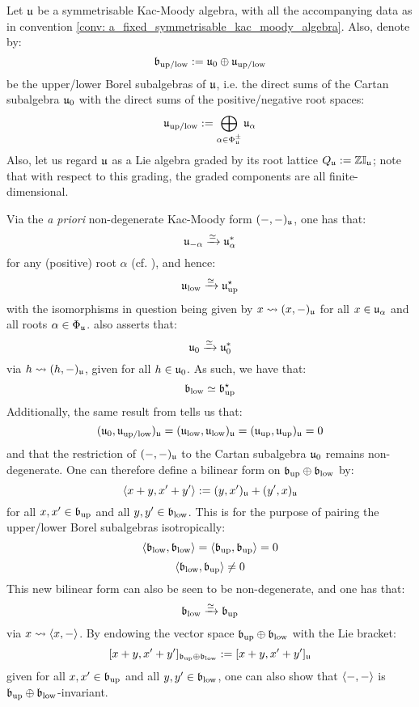         \begin{example} \label{example: kac_moody_manin_triple}
            Let $\mathfrak{u}$ be a symmetrisable Kac-Moody algebra, with all the accompanying data as in convention \ref{conv: a_fixed_symmetrisable_kac_moody_algebra}. Also, denote by:
                $$\mathfrak{b}_{\mathrm{up}/\mathrm{low}} := \mathfrak{u}_0 \oplus \mathfrak{u}_{\mathrm{up}/\mathrm{low}}$$
            be the upper/lower Borel subalgebras of $\mathfrak{u}$, i.e. the direct sums of the Cartan subalgebra $\mathfrak{u}_0$ with the direct sums of the positive/negative root spaces:
                $$\mathfrak{u}_{\mathrm{up}/\mathrm{low}} := \bigoplus_{\alpha \in \Phi_{\mathfrak{u}}^{\pm}} \mathfrak{u}_{\alpha}$$
            Also, let us regard $\mathfrak{u}$ as a Lie algebra graded by its root lattice $Q_{\mathfrak{u}} := \mathbb{Z}\mathbb{I}_{\mathfrak{u}}$; note that with respect to this grading, the graded components are all finite-dimensional.

            Via the \textit{a priori} non-degenerate Kac-Moody form $(-, -)_{\mathfrak{u}}$, one has that:
                $$\mathfrak{u}_{-\alpha} \xrightarrow[]{\simeq} \mathfrak{u}_{\alpha}^*$$
            for any (positive) root $\alpha$ (cf. \cite[Theorem 2.2]{kac_infinite_dimensional_lie_algebras}), and hence:
                $$\mathfrak{u}_{\mathrm{low}} \xrightarrow[]{\simeq} \mathfrak{u}_{\mathrm{up}}^{\star}$$
            with the isomorphisms in question being given by $x \leadsto (x, -)_{\mathfrak{u}}$ for all $x \in \mathfrak{u}_{\alpha}$ and all roots $\alpha \in \Phi_{\mathfrak{u}}$. \cite[Theorem 2.2]{kac_infinite_dimensional_lie_algebras} also asserts that:
                $$\mathfrak{u}_0 \xrightarrow[]{\simeq} \mathfrak{u}_0^*$$
            via $h \leadsto (h, -)_{\mathfrak{u}}$, given for all $h \in \mathfrak{u}_0$. As such, we have that:
                $$\mathfrak{b}_{\mathrm{low}} \simeq \mathfrak{b}_{\mathrm{up}}^{\star}$$
            Additionally, the same result from \cite{kac_infinite_dimensional_lie_algebras} tells us that:
                $$(\mathfrak{u}_0, \mathfrak{u}_{\mathrm{up}/\mathrm{low}})_{\mathfrak{u}} = (\mathfrak{u}_{\mathrm{low}}, \mathfrak{u}_{\mathrm{low}})_{\mathfrak{u}} = (\mathfrak{u}_{\mathrm{up}}, \mathfrak{u}_{\mathrm{up}})_{\mathfrak{u}} = 0$$
            and that the restriction of $(-, -)_{\mathfrak{u}}$ to the Cartan subalgebra $\mathfrak{u}_0$ remains non-degenerate. One can therefore define a bilinear form on $\mathfrak{b}_{\mathrm{up}} \oplus \mathfrak{b}_{\mathrm{low}}$ by:
                $$\langle x + y, x' + y'\rangle := (y, x')_{\mathfrak{u}} + (y', x)_{\mathfrak{u}}$$
            for all $x, x' \in \mathfrak{b}_{\mathrm{up}}$ and all $y, y' \in \mathfrak{b}_{\mathrm{low}}$. This is for the purpose of pairing the upper/lower Borel subalgebras isotropically:
                $$\langle\mathfrak{b}_{\mathrm{low}}, \mathfrak{b}_{\mathrm{low}}\rangle = \langle\mathfrak{b}_{\mathrm{up}}, \mathfrak{b}_{\mathrm{up}}\rangle = 0$$
                $$\langle\mathfrak{b}_{\mathrm{low}}, \mathfrak{b}_{\mathrm{up}}\rangle \not = 0$$
            This new bilinear form can also be seen to be non-degenerate, and one has that:
                $$\mathfrak{b}_{\mathrm{low}} \xrightarrow[]{\simeq} \mathfrak{b}_{\mathrm{up}}$$
            via $x \leadsto \langle x, -\rangle$. By endowing the vector space $\mathfrak{b}_{\mathrm{up}} \oplus \mathfrak{b}_{\mathrm{low}}$ with the Lie bracket:
                $$[x + y, x' + y']_{\mathfrak{b}_{\mathrm{up}} \oplus \mathfrak{b}_{\mathrm{low}}} := [x + y, x' + y']_{\mathfrak{u}}$$
            given for all $x, x' \in \mathfrak{b}_{\mathrm{up}}$ and all $y, y' \in \mathfrak{b}_{\mathrm{low}}$, one can also show that $\langle-, -\rangle$ is $\mathfrak{b}_{\mathrm{up}} \oplus \mathfrak{b}_{\mathrm{low}}$-invariant.


\end{example}
